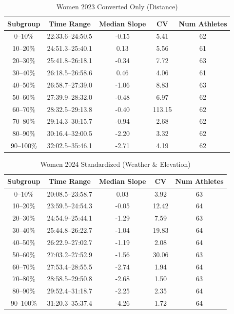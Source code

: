 \documentclass[suppldata]{interact}
\theoremstyle{plain}%
\theoremstyle{definition}
\theoremstyle{remark}
\begin{document}
\begin{table}[htbp]
\renewcommand{\arraystretch}{1.2}
\begin{tabular}{c c c c c}
\toprule
Subgroup& Time Range & Median Slope & CV& Num Athletes \\
\midrule
0--10\%   & 22:33.6--24:50.5 & -0.15 & 5.41   & 62 \\
    10--20\%  & 24:51.3--25:40.1 &  0.13 & 5.56   & 61 \\
    20--30\%  & 25:41.8--26:18.1 & -0.34 & 7.72   & 63 \\
    30--40\%  & 26:18.5--26:58.6 &  0.46 & 4.06   & 61 \\
    40--50\%  & 26:58.7--27:39.0 & -1.06 & 8.83   & 63 \\
    50--60\%  & 27:39.9--28:32.0 & -0.48 & 6.97   & 62 \\
    60--70\%  & 28:32.5--29:13.8 & -0.40 & 113.15 & 62 \\
    70--80\%  & 29:14.3--30:15.7 & -0.94 & 2.68   & 62 \\
    80--90\%  & 30:16.4--32:00.5 & -2.20 & 3.32   & 62 \\
    90--100\% & 32:02.5--35:46.1 & -2.71 & 4.19   & 62 \\
\bottomrule
\end{tabular}
\centering
\caption{Women 2023 Converted Only (Distance)}
\label{tab:women_2023_converted}
\end{table}


\begin{table}[htbp]
\renewcommand{\arraystretch}{1.2}
\begin{tabular}{c c c c c}
\toprule
Subgroup& Time Range & Median Slope & CV& Num Athletes \\
\midrule
0--10\%   & 20:08.5--23:58.7 &  0.03 & 3.92  & 63 \\
    10--20\%  & 23:59.5--24:54.3 & -0.05 & 12.42 & 64 \\
    20--30\%  & 24:54.9--25:44.1 & -1.29 & 7.59  & 63 \\
    30--40\%  & 25:44.8--26:22.7 & -1.04 & 19.83 & 64 \\
    40--50\%  & 26:22.9--27:02.7 & -1.19 & 2.08  & 64 \\
    50--60\%  & 27:03.2--27:52.9 & -1.56 & 30.06 & 63 \\
    60--70\%  & 27:53.4--28:55.5 & -2.74 & 1.94  & 64 \\
    70--80\%  & 28:58.5--29:50.8 & -2.68 & 1.50  & 63 \\
    80--90\%  & 29:52.4--31:18.7 & -2.25 & 2.35  & 64 \\
    90--100\% & 31:20.3--35:37.4 & -4.26 & 1.72  & 64 \\
\bottomrule
\end{tabular}
\centering
\caption{Women 2024 Standardized (Weather \& Elevation)}
\label{tab:women_2024_standard}
\end{table}
\end{document}

